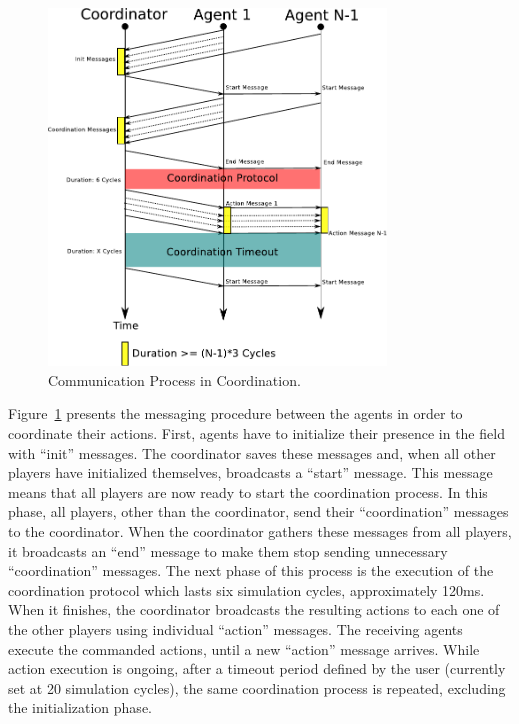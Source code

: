 \begin{figure}[t!]
\centering
  \includegraphics[width=0.8\textwidth]{Chapter4/figures/CoordComm.pdf}
  \caption{Communication Process in Coordination.} 
  \label{fig:coordinationprocess}
\end{figure}

Figure~\ref{fig:coordinationprocess} presents the messaging procedure between the agents in order to coordinate their actions. First, agents have to initialize their presence in the field with ``init'' messages. The coordinator saves these messages and, when all other players have initialized themselves, broadcasts a ``start'' message. This message means that all players are now ready to start the coordination process. In this phase, all players, other than the coordinator, send their ``coordination'' messages to the coordinator. When the coordinator gathers these messages from all players, it broadcasts an ``end'' message to make them stop sending unnecessary ``coordination'' messages. The next phase of this process is the execution of the coordination protocol which lasts six simulation cycles, approximately 120ms. When it finishes, the coordinator broadcasts the resulting actions to each one of the other players using individual ``action'' messages. The receiving agents execute the commanded actions, until a new ``action'' message arrives. While action execution is ongoing, after a timeout period defined by the user (currently set at 20 simulation cycles), the same coordination process is repeated, excluding the initialization phase.


